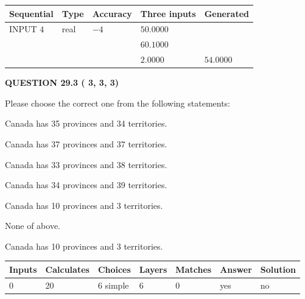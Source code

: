 \documentclass[12pt]{article}
\begin{document}
   
  
  
\noindent\begin{tabular}{|l|l|l|l|l|}
\hline
 Sequential & Type & Accuracy & Three inputs & Generated \\ 
\hline
 
 
  INPUT $           4$ & real & $          -4 $ & $
 50.0000
  $ & \\
  & & &  $
 60.1000
  $ & \\
  & & &  $
 2.0000
 $ & $ 54.0000 $ 
 \\  \hline  
 \end{tabular}
   
   
  
\vspace{0.2in}
  
{\textbf{\Large{QUESTION
29.3 
 (          3,          3,          3)
}}}
  
  
Please choose the correct one from the following statements:
 
 
Canada has  %
35 provinces and  %
34 territories.
 
 
Canada has  %
37 provinces and  %
37 territories.
 
 
Canada has  %
33 provinces and  %
38 territories.
 
 
Canada has  %
34 provinces and  %
39 territories.
 
 
Canada has  %
10 provinces and  %
3 territories.
 
 
 None of above.
 
 
\noindent{}
 
 
Canada has  %
10 provinces and  %
3 territories.
 
 
\noindent{}
 
 
   
   
   
   
\noindent\begin{tabular}{|l|l|l|l|l|l|l|}
 \hline
Inputs & Calculates & Choices & Layers & Matches & Answer & Solution \\ \hline
           0 & 
          20 & 
           6
  simple  
  & 
           6 & 
           0 & 
  yes & 
  no 
  \\ \hline
 \end{tabular}
   
\end{document}
